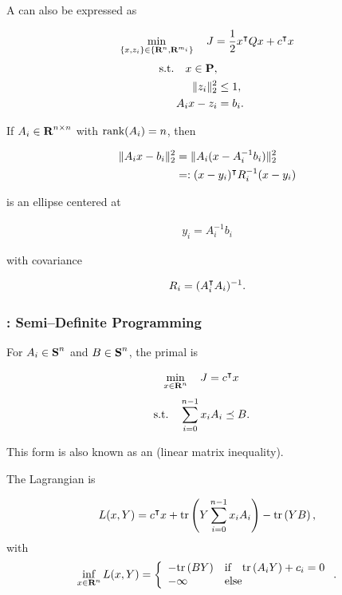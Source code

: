 \documentclass{article}
\begin{document}
A \QCQP can also be expressed as 

\begin{align*}
    \min_{\{x,z_i\}\in\{\textbf{R}^n,\textbf{R}^{m_i}\}}\quad J = \frac{1}{2} x^\intercal Q x + c^\intercal x
\end{align*}
\begin{align*}
    \text{s.t.}\quad x\in\textbf{P},\\
    \|z_i\|_2^2&\leq 1,\\
    A_ix-z_i&=b_i.
\end{align*}

If $A_i\in\textbf{R}^{n\times n}$ with $\text{rank}(A_i)=n$, then 

\begin{align*}
    \|A_i x-b_i\|_2^2 &= \|A_i (x-A_i^{-1}b_i)\|_2^2\\
    &=:(x-y_i)^\intercal R_i^{-1} (x-y_i)
\end{align*}

is an ellipse centered at 

\begin{align*}
    y_i=A_i^{-1}b_i
\end{align*}

with covariance

\begin{align*}
    R_i=(A_i^\intercal A_i)^{-1}.
\end{align*}


\clearpage

\subsubsection{\SDP: Semi--Definite Programming}

For $A_i\in\textbf{S}^n$ and $B\in\textbf{S}^n$, the primal \SDP is

\begin{align}
    \min_{x\in\textbf{R}^n}\quad J &= c^\intercal x
\end{align}
\begin{align*}
    \text{s.t.}\quad \sum_{i=0}^{n-1} x_iA_i &\preceq B.
\end{align*}

This form is also known as an \LMI (linear matrix inequality).

The Lagrangian is

\begin{align*}
    L(x,Y)=c^\intercal x +\text{tr}\left(Y\sum_{i=0}^{n-1}x_iA_i\right)-\text{tr}\left(YB\right),
\end{align*}
with
\begin{align*}
    \inf_{x\in\textbf{R}^n} L(x,Y)=\left\{\begin{array}{lllllllllllllllllll}-\text{tr}\left(BY\right) & \text{if}\quad \text{tr}\left(A_iY\right)+c_i=0\\
    -\infty & \text{else}\end{array}\right..
\end{align*}
\end{document}

